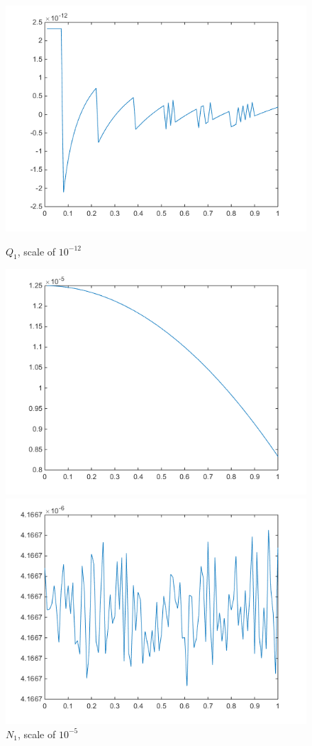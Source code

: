 \documentclass[10pt,letterpaper]{article}
\begin{document}
\begin{figure}[!htb]
  \includegraphics[width=\linewidth]{figures/gradDifQ.png}
  \caption{$Q_1$, scale of $10^{-12}$}\label{fig:gradDifQ}
\endminipage\hfill
{}
  \includegraphics[width=\linewidth]{figures/gradDifN.png}
  \caption{$N_1$, scale of $10^{-5}$}\label{fig:gradDifN}
\endminipage\hfill
{}
  \includegraphics[width=\linewidth]{figures/gradDifS.png}

\end{figure}
\end{document}
